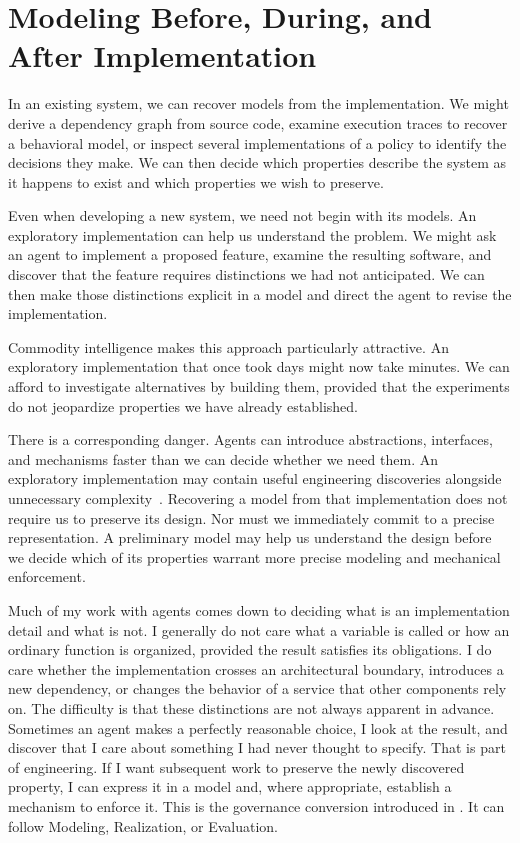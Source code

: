 \section{Modeling Before, During, and After Implementation}\label{heading:greenfield-and-brownfield-mage}

In an existing system, we can recover models from the implementation. We might derive a dependency graph from source code, examine execution traces to recover a behavioral model, or inspect several implementations of a policy to identify the decisions they make. We can then decide which properties describe the system as it happens to exist and which properties we wish to preserve.

Even when developing a new system, we need not begin with its models. An exploratory implementation can help us understand the problem. We might ask an agent to implement a proposed feature, examine the resulting software, and discover that the feature requires distinctions we had not anticipated. We can then make those distinctions explicit in a model and direct the agent to revise the implementation.

Commodity intelligence makes this approach particularly attractive. An exploratory implementation that once took days might now take minutes. We can afford to investigate alternatives by building them, provided that the experiments do not jeopardize properties we have already established.

There is a corresponding danger. Agents can introduce abstractions, interfaces, and mechanisms faster than we can decide whether we need them. An exploratory implementation may contain useful engineering discoveries alongside unnecessary complexity~\citep{oukhay2026aicodedoesntstick,ogenrwot2026patchtrack}. Recovering a model from that implementation does not require us to preserve its design. Nor must we immediately commit to a precise representation. A preliminary model may help us understand the design before we decide which of its properties warrant more precise modeling and mechanical enforcement.

Much of my work with agents comes down to deciding what is an implementation detail and what is not. I generally do not care what a variable is called or how an ordinary function is organized, provided the result satisfies its obligations. I do care whether the implementation crosses an architectural boundary, introduces a new dependency, or changes the behavior of a service that other components rely on. The difficulty is that these distinctions are not always apparent in advance. Sometimes an agent makes a perfectly reasonable choice, I look at the result, and discover that I care about something I had never thought to specify. That is part of engineering. If I want subsequent work to preserve the newly discovered property, I can express it in a model and, where appropriate, establish a mechanism to enforce it. This is the governance conversion introduced in . It can follow Modeling, Realization, or Evaluation.

